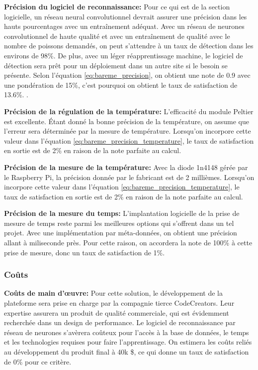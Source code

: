 \textbf{Précision du logiciel de reconnaissance:} Pour ce qui est de la section logicielle, un réseau neural convolutionnel devrait assurer une précision dans les hauts pourcentages avec un entraînement adéquat. Avec un réseau de neurones convolutionnel de haute qualité et avec un entraînement de qualité avec le nombre de poissons demandés, on peut s’attendre à un taux de détection dans les environs de 98\%. De plus, avec un léger réapprentissage machine, le logiciel de détection sera prêt pour un déploiement dans un autre site si le besoin se présente. Selon l’équation \ref{eq:bareme_precision}, on obtient une note de 0.9 avec une pondération de 15\%, c’est pourquoi on obtient le taux de satisfaction de 13.6\%. \cite{neural_yt}.
\vspace{5mm}


\textbf{Précision de la régulation de la température:} L'efficacité du module Peltier est excellente. Étant donné la bonne précision de la température, on assume que l'erreur sera déterminée par la mesure de température. Lorsqu'on incorpore cette valeur dans l'équation \ref{eq:bareme_precision_temperature}, le taux de satisfaction en sortie est de 2\% en raison de la note parfaite au calcul.
\vspace{5mm}

\textbf{Précision de la mesure de la température:} Avec la diode 1n4148 gérée par le Raspberry Pi, la précision donnée par le fabricant est de 2 millièmes. Lorsqu'on incorpore cette valeur dans l'équation \ref{eq:bareme_precision_temperature}, le taux de satisfaction en sortie est de 2\% en raison de la note parfaite au calcul.
\vspace{5mm}

\textbf{Précision de la mesure du temps:}
L’implantation logicielle de la prise de mesure de temps reste parmi les meilleures options qui s’offrent dans un tel projet. Avec une implémentation par méta-données, on obtient une précision allant à miliseconde près. Pour cette raison, on accordera la note de 100\% à cette prise de mesure, donc un taux de satisfaction de 1\%.

\subsubsection{Coûts}

\textbf{Coûts de main d’œuvre:}
Pour cette solution, le développement de la plateforme sera prise en charge par la compagnie tierce CodeCreators. Leur expertise assurera un produit de qualité commerciale, qui est évidemment recherchée dans un design de performance. Le logiciel de reconnaissance par réseau de neurones s'avèrera coûteux pour l'accès à la base de données, le temps  et les technologies requises pour faire l'apprentissage. On estimera les coûts reliés au développement du produit final à 40k \$, ce qui donne un taux de satisfaction de 0\% pour ce critère.
\vspace{5mm}


